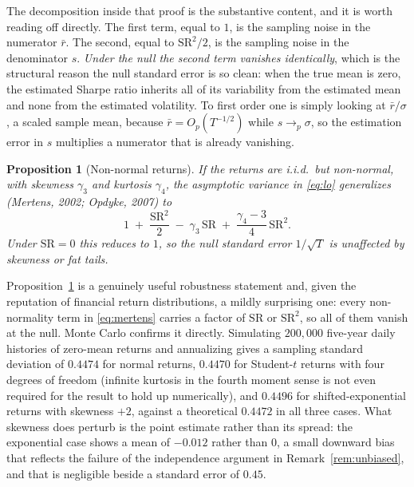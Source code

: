 \documentclass[11pt]{article}
\newtheorem{proposition}{Proposition}
\theoremstyle{remark}
\theoremstyle{definition}
\newcommand{\SR}{\text{SR}}
\begin{document}
The decomposition inside that proof is the substantive content, and it is worth reading off directly. The first term, equal to $1$, is the sampling noise in the numerator $\bar r$. The second, equal to $\SR^2/2$, is the sampling noise in the denominator $s$. \emph{Under the null the second term vanishes identically}, which is the structural reason the null standard error is so clean: when the true mean is zero, the estimated Sharpe ratio inherits all of its variability from the estimated mean and none from the estimated volatility. To first order one is simply looking at $\bar r/\sigma$, a scaled sample mean, because $\bar r = O_p(T^{-1/2})$ while $s \to_p \sigma$, so the estimation error in $s$ multiplies a numerator that is already vanishing.

\begin{proposition}[Non-normal returns]
\label{prop:mertens}
If the returns are i.i.d.\ but non-normal, with skewness $\gamma_3$ and kurtosis $\gamma_4$, the asymptotic variance in \eqref{eq:lo} generalizes (Mertens, 2002; Opdyke, 2007) to
\begin{equation}
\label{eq:mertens}
1 \;+\; \frac{\SR^2}{2} \;-\; \gamma_3\,\SR \;+\; \frac{\gamma_4 - 3}{4}\,\SR^2 .
\end{equation}
Under $\SR = 0$ this reduces to $1$, so the null standard error $1/\sqrt{T}$ is unaffected by skewness or fat tails.
\end{proposition}

Proposition~\ref{prop:mertens} is a genuinely useful robustness statement and, given the reputation of financial return distributions, a mildly surprising one: every non-normality term in \eqref{eq:mertens} carries a factor of $\SR$ or $\SR^2$, so all of them vanish at the null. Monte Carlo confirms it directly. Simulating $200{,}000$ five-year daily histories of zero-mean returns and annualizing gives a sampling standard deviation of $0.4474$ for normal returns, $0.4470$ for Student-$t$ returns with four degrees of freedom (infinite kurtosis in the fourth moment sense is not even required for the result to hold up numerically), and $0.4496$ for shifted-exponential returns with skewness $+2$, against a theoretical $0.4472$ in all three cases. What skewness does perturb is the point estimate rather than its spread: the exponential case shows a mean of $-0.012$ rather than $0$, a small downward bias that reflects the failure of the independence argument in Remark~\ref{rem:unbiased}, and that is negligible beside a standard error of $0.45$.
\end{document}
